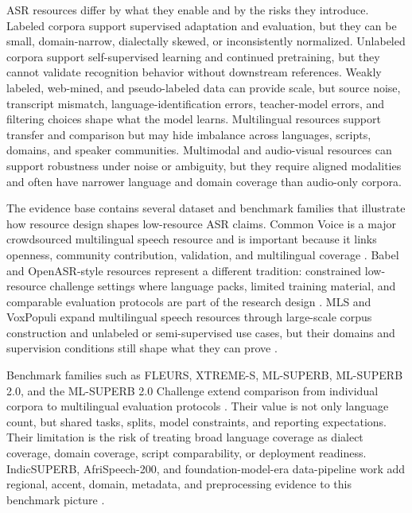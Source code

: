 \documentclass[pdflatex,sn-basic,iicol]{sn-jnl}
\theoremstyle{thmstyleone}
\theoremstyle{thmstyletwo}
\theoremstyle{thmstylethree}
\begin{document}
ASR resources differ by what they enable and by the risks they introduce. Labeled corpora support supervised adaptation and evaluation, but they can be small, domain-narrow, dialectally skewed, or inconsistently normalized. Unlabeled corpora support self-supervised learning and continued pretraining, but they cannot validate recognition behavior without downstream references. Weakly labeled, web-mined, and pseudo-labeled data can provide scale, but source noise, transcript mismatch, language-identification errors, teacher-model errors, and filtering choices shape what the model learns. Multilingual resources support transfer and comparison but may hide imbalance across languages, scripts, domains, and speaker communities. Multimodal and audio-visual resources can support robustness under noise or ambiguity, but they require aligned modalities and often have narrower language and domain coverage than audio-only corpora.

The evidence base contains several dataset and benchmark families that illustrate how resource design shapes low-resource ASR claims. Common Voice is a major crowdsourced multilingual speech resource and is important because it links openness, community contribution, validation, and multilingual coverage \citep{ardila2020commonvoice}. Babel and OpenASR-style resources represent a different tradition: constrained low-resource challenge settings where language packs, limited training material, and comparable evaluation protocols are part of the research design \citep{gales2014_babel_project_research_cued,peterson2022_openasr21}. MLS and VoxPopuli expand multilingual speech resources through large-scale corpus construction and unlabeled or semi-supervised use cases, but their domains and supervision conditions still shape what they can prove \citep{pratap20_interspeech,wang2021voxpopuli}.

Benchmark families such as FLEURS, XTREME-S, ML-SUPERB, ML-SUPERB 2.0, and the ML-SUPERB 2.0 Challenge extend comparison from individual corpora to multilingual evaluation protocols \citep{conneau2022fleurs,conneau2022xtreme_s,shi2023mlsuperb,shi2024mlsuperb2,chen2025mlsuperb2challenge}. Their value is not only language count, but shared tasks, splits, model constraints, and reporting expectations. Their limitation is the risk of treating broad language coverage as dialect coverage, domain coverage, script comparability, or deployment readiness. IndicSUPERB, AfriSpeech-200, and foundation-model-era data-pipeline work add regional, accent, domain, metadata, and preprocessing evidence to this benchmark picture \citep{javed2023indsuperb,olatunji2023_afrispeech200,tian24_interspeech}.
\end{document}
